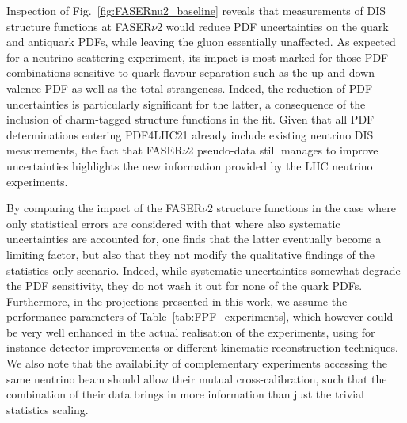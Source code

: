 Inspection of Fig.~\ref{fig:FASERnu2_baseline} reveals that measurements of DIS structure
functions at FASER$\nu$2 would reduce PDF uncertainties on the quark and antiquark
PDFs, while leaving
the gluon essentially unaffected.
%
As expected for a neutrino scattering experiment, its impact is most marked for
those PDF combinations sensitive to quark flavour separation such as
the up and down valence PDF as well as the total strangeness.
%
Indeed, the reduction of PDF uncertainties is particularly significant for the latter,
a consequence of the inclusion of charm-tagged structure functions in the fit.
%
Given that all PDF determinations entering PDF4LHC21 already include existing neutrino
DIS measurements, the fact that FASER$\nu$2 pseudo-data still manages to improve
uncertainties highlights the new information provided by the LHC neutrino experiments.

By comparing the impact of the FASER$\nu$2 structure functions
in the case where only statistical errors are considered with that
where also systematic uncertainties are accounted for,
one finds that the latter eventually become a limiting factor,
but also that they not modify the qualitative findings of the statistics-only scenario.
%
Indeed, while systematic uncertainties somewhat degrade the PDF sensitivity,
they do not wash it out for none of the quark PDFs.
%
Furthermore, in the projections presented in this work,
we assume the performance parameters of  Table~\ref{tab:FPF_experiments}, which
however could be very well enhanced in the actual realisation of the experiments,
using for instance detector improvements or different kinematic reconstruction techniques.
%
We also note that the availability of complementary experiments accessing the same neutrino
beam should allow their mutual cross-calibration, such that the combination of their
data brings in more information than just the trivial statistics scaling.

